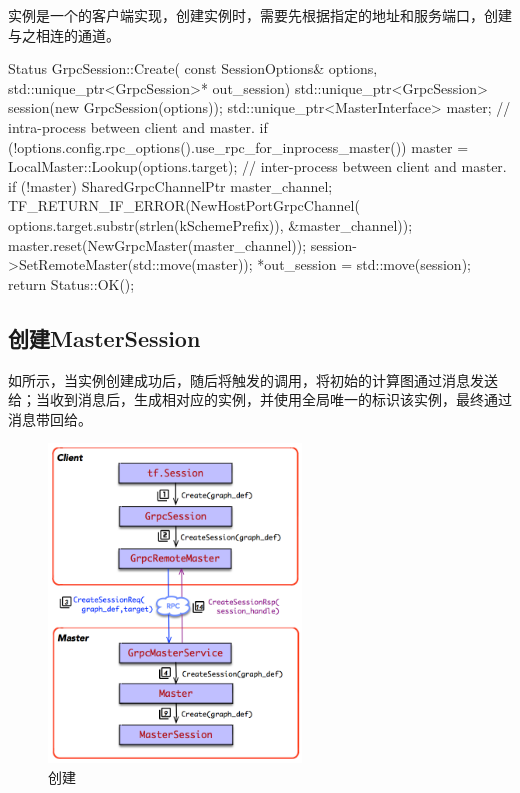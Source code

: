 \begin{content}
实例是一个的客户端实现，创建实例时，需要先根据指定的地址和服务端口，创建与之相连的通道。

\begin{leftbar}
\begin{c++}
Status GrpcSession::Create(
    const SessionOptions& options,
    std::unique_ptr<GrpcSession>* out_session) {
  std::unique_ptr<GrpcSession> session(new GrpcSession(options));
  std::unique_ptr<MasterInterface> master;
  // intra-process between client and master.
  if (!options.config.rpc_options().use_rpc_for_inprocess_master()) {
    master = LocalMaster::Lookup(options.target);
  }
  // inter-process between client and master.
  if (!master) {
    SharedGrpcChannelPtr master_channel;
    TF_RETURN_IF_ERROR(NewHostPortGrpcChannel(
        options.target.substr(strlen(kSchemePrefix)), &master_channel));
    master.reset(NewGrpcMaster(master_channel));
  }
  session->SetRemoteMaster(std::move(master));
  *out_session = std::move(session);
  return Status::OK();
}
\end{c++}
\end{leftbar}

\subsection{创建MasterSession}

如所示，当实例创建成功后，随后将触发的调用，将初始的计算图通过消息发送给；当收到消息后，生成相对应的实例，并使用全局唯一的标识该实例，最终通过消息带回给。

\begin{figure}[H]
\centering
\includegraphics[width=0.6\textwidth]{figures/dist-create-master-session-1.png}
\caption{创建}
 \label{fig:dist-create-master-session-1}
\end{figure}


\end{content}
